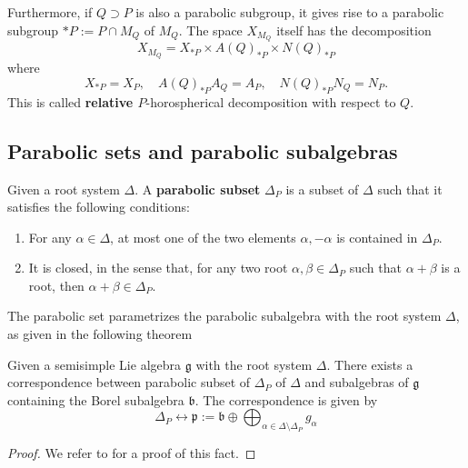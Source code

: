 Furthermore, if $Q\supset P$ is also a parabolic subgroup, it gives rise to a parabolic subgroup $\ast P := P \cap M_Q$ of $M_Q$.
The space $X_{M_Q}$ itself has the decomposition
\[X_{M_Q} = X_{\ast P} \times A(Q)_{\ast P} \times N(Q)_{\ast P}\]
where $$ X_{\ast P} = X_P, \quad A(Q)_{\ast P}A_Q=A_P, \quad N(Q)_{\ast P}N_Q=N_P.$$ This is called \textbf{relative $P$}-horospherical decomposition with respect to $Q$.
\subsection{Parabolic sets and parabolic subalgebras}
\begin{definition}
    Given a root system $\Delta$. A \textbf{parabolic subset} $\Delta_P$ is a subset of $\Delta$ such that
    it satisfies the following conditions:
    \begin{enumerate}
        \item For any $\alpha \in \Delta$, at most one of the two elements $\alpha, - \alpha$ is contained in $\Delta_P$.
        \item It is closed, in the sense that, for any two root $\alpha,\beta \in \Delta_P$ such that $\alpha+\beta$ is a root, then $\alpha+\beta \in \Delta_P$.
    \end{enumerate}
\end{definition}
The parabolic set parametrizes the parabolic subalgebra with the root system $\Delta$, as given in the following theorem
\begin{theorem}
    Given a semisimple Lie algebra $\mathfrak{g}$ with the root system $\Delta$. There exists a correspondence between
    parabolic subset of $\Delta_P$ of $\Delta$ and subalgebras of $\mathfrak{g}$ containing the
    Borel subalgebra $\mathfrak{b}$. The correspondence is given by
    \[ \Delta_P \longleftrightarrow \mathfrak{p}:= \mathfrak{b}\oplus \bigoplus_{\alpha \in \Delta \setminus \Delta_P} g_{\alpha}\]
\end{theorem}
\begin{proof}
    We refer to \cite{} for a proof of this fact.
\end{proof}
